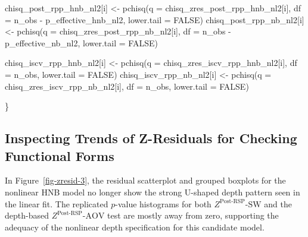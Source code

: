 \documentclass[
  english,
  letterpaper,
  DIV=11,
  numbers=noendperiod]{scrartcl}
\newenvironment{Shaded}{\begin{snugshade}}{\end{snugshade}}
\newcommand{\AttributeTok}[1]{\textcolor[rgb]{0.40,0.45,0.13}{#1}}
\newcommand{\ConstantTok}[1]{\textcolor[rgb]{0.56,0.35,0.01}{#1}}
\newcommand{\FunctionTok}[1]{\textcolor[rgb]{0.28,0.35,0.67}{#1}}
\newcommand{\NormalTok}[1]{\textcolor[rgb]{0.00,0.23,0.31}{#1}}
\newcommand{\OtherTok}[1]{\textcolor[rgb]{0.00,0.23,0.31}{#1}}
\newcommand{\SpecialCharTok}[1]{\textcolor[rgb]{0.37,0.37,0.37}{#1}}
\begin{document}
\begin{Shaded}
\begin{Highlighting}[]
\NormalTok{  chisq\_post\_rpp\_hnb\_nl2[i] }\OtherTok{\textless{}{-}} \FunctionTok{pchisq}\NormalTok{(}\AttributeTok{q =}\NormalTok{ chisq\_zres\_post\_rpp\_hnb\_nl2[i], }\AttributeTok{df =}\NormalTok{ n\_obs }\SpecialCharTok{{-}}\NormalTok{ p\_effective\_hnb\_nl2, }\AttributeTok{lower.tail =} \ConstantTok{FALSE}\NormalTok{)}
\NormalTok{  chisq\_post\_rpp\_nb\_nl2[i]  }\OtherTok{\textless{}{-}} \FunctionTok{pchisq}\NormalTok{(}\AttributeTok{q =}\NormalTok{ chisq\_zres\_post\_rpp\_nb\_nl2[i],  }\AttributeTok{df =}\NormalTok{ n\_obs }\SpecialCharTok{{-}}\NormalTok{ p\_effective\_nb\_nl2,  }\AttributeTok{lower.tail =} \ConstantTok{FALSE}\NormalTok{)}
  
\NormalTok{  chisq\_iscv\_rpp\_hnb\_nl2[i] }\OtherTok{\textless{}{-}} \FunctionTok{pchisq}\NormalTok{(}\AttributeTok{q =}\NormalTok{ chisq\_zres\_iscv\_rpp\_hnb\_nl2[i], }\AttributeTok{df =}\NormalTok{ n\_obs, }\AttributeTok{lower.tail =} \ConstantTok{FALSE}\NormalTok{)}
\NormalTok{  chisq\_iscv\_rpp\_nb\_nl2[i]  }\OtherTok{\textless{}{-}} \FunctionTok{pchisq}\NormalTok{(}\AttributeTok{q =}\NormalTok{ chisq\_zres\_iscv\_rpp\_nb\_nl2[i],  }\AttributeTok{df =}\NormalTok{ n\_obs,  }\AttributeTok{lower.tail =} \ConstantTok{FALSE}\NormalTok{)}
  
\NormalTok{\}}
\end{Highlighting}
\end{Shaded}

\subsection{Inspecting Trends of Z-Residuals for Checking Functional
Forms}\label{inspecting-trends-of-z-residuals-for-checking-functional-forms-1}

In Figure~\ref{fig-zresid-3}, the residual scatterplot and grouped
boxplots for the nonlinear HNB model no longer show the strong U-shaped
depth pattern seen in the linear fit. The replicated \(p\)-value
histograms for both \(Z^{\text{Post-RSP}}\text{-SW}\) and the
depth-based \(Z^{\text{Post-RSP}}\text{-AOV}\) test are mostly away from
zero, supporting the adequacy of the nonlinear depth specification for
this candidate model.
\end{document}
